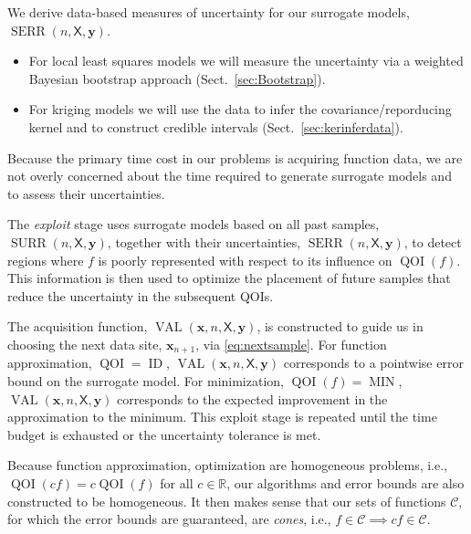 \documentclass[11pt]{NSFamsart}
\DeclareMathOperator{\QOI}{QOI}
\DeclareMathOperator{\SURR}{SURR}
\DeclareMathOperator{\VAL}{VAL}
\DeclareMathOperator{\MIN}{MIN}
\DeclareMathOperator{\ID}{ID}
\DeclareMathOperator{\SURRERR}{SERR}
\newcommand{\reals}{{\mathbb{R}}}
\newcommand{\mX}{\mathsf{X}}
\newcommand{\bx}{{\boldsymbol{x}}}
\newcommand{\by}{{\boldsymbol{y}}}
\newcommand{\calc}{{\mathcal{C}}}
\begin{document}
We derive data-based measures of uncertainty for our surrogate models, $\SURRERR(n,\mX,\by)$.
\begin{itemize}
\item For local least squares models we will measure the uncertainty via a weighted Bayesian bootstrap approach (Sect.\ \ref{sec:Bootstrap}).
\item For kriging models we will use the data to infer the   covariance/reporducing kernel and to construct credible intervals (Sect.\ \ref{sec:kerinferdata}).
\end{itemize}
Because the primary time cost in our problems is acquiring function data, we are not overly concerned about the time required to generate surrogate models and to assess their uncertainties.

The \emph{exploit} stage uses surrogate models based on all past samples, $\SURR(n,\mX,\by)$, together with their uncertainties, $\SURRERR(n,\mX,\by)$, to detect regions where $f$ is poorly represented with respect to its influence on $\QOI(f)$.  This information is then used to optimize the placement of future samples that reduce the uncertainty in the subsequent  QOIs. 

The acquisition function, $\VAL(\bx,n,\mX, \by)$, is constructed to guide us in choosing the next data site, $\bx_{n+1}$, via \eqref{eq:nextsample}.  For function approximation, $\QOI = \ID$, $\VAL(\bx,n,\mX, \by)$ corresponds to a pointwise error bound on the surrogate model.  For minimization, $\QOI(f) = \MIN$, $\VAL(\bx,n,\mX, \by)$ corresponds to the expected improvement in the approximation to the minimum.  This exploit stage is repeated until the time budget is exhausted or the uncertainty tolerance is met.

Because function approximation, optimization are homogeneous problems, i.e., $\QOI(cf) = c\QOI(f)$ for all $c \in \reals$, our algorithms and error bounds are also constructed to be homogeneous.  It then makes sense that our sets of functions $\calc$, for which the error bounds are guaranteed, are \emph{cones}, i.e., $f \in \calc \implies cf \in \calc$.
\end{document}
